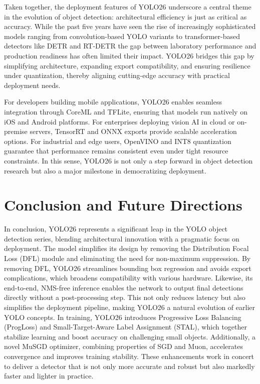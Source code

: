 \documentclass{article}
\begin{document}
Taken together, the deployment features of YOLO26 underscore a central theme in the evolution of object detection: architectural efficiency is just as critical as accuracy. While the past five years have seen the rise of increasingly sophisticated models ranging from convolution-based YOLO variants to transformer-based detectors like DETR and RT-DETR the gap between laboratory performance and production readiness has often limited their impact. YOLO26 bridges this gap by simplifying architecture, expanding export compatibility, and ensuring resilience under quantization, thereby aligning cutting-edge accuracy with practical deployment needs.

For developers building mobile applications, YOLO26 enables seamless integration through CoreML and TFLite, ensuring that models run natively on iOS and Android platforms. For enterprises deploying vision AI in cloud or on-premise servers, TensorRT and ONNX exports provide scalable acceleration options. For industrial and edge users, OpenVINO and INT8 quantization guarantee that performance remains consistent even under tight resource constraints. In this sense, YOLO26 is not only a step forward in object detection research but also a major milestone in democratizing deployment.

\section{Conclusion and Future Directions}

In conclusion, YOLO26 represents a significant leap in the YOLO object detection series, blending architectural innovation with a pragmatic focus on deployment. The model simplifies its design by removing the Distribution Focal Loss (DFL) module and eliminating the need for non-maximum suppression. By removing DFL, YOLO26 streamlines bounding box regression and avoids export complications, which broadens compatibility with various hardware. Likewise, its end-to-end, NMS-free inference enables the network to output final detections directly without a post-processing step. This not only reduces latency but also simplifies the deployment pipeline, making YOLO26 a natural evolution of earlier YOLO concepts. In training, YOLO26 introduces Progressive Loss Balancing (ProgLoss) and Small-Target-Aware Label Assignment (STAL), which together stabilize learning and boost accuracy on challenging small objects. Additionally, a novel MuSGD optimizer, combining properties of SGD and Muon, accelerates convergence and improves training stability. These enhancements work in concert to deliver a detector that is not only more accurate and robust but also markedly faster and lighter in practice.
\end{document}
